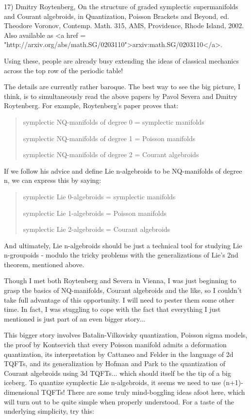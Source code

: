 17) Dmitry Roytenberg, On the structure of graded symplectic 
supermanifolds and Courant algebroids, in Quantization, Poisson 
Brackets and Beyond, ed. Theodore Voronov, Contemp. Math. 315, 
AMS, Providence, Rhode Island, 2002.  Also available as 
<a href = "http://arxiv.org/abs/math.SG/0203110">arxiv:math.SG/0203110</a>.

Using these, people are already busy extending the ideas of
classical mechanics across the top row of the periodic table!

The details are currently rather baroque.  The best way to 
see the big picture, I think, is to simultaneously read the 
above papers by Pavol Severa and Dmitry Roytenberg.  For example,
Roytenberg's paper proves that: 

\begin{quote}
symplectic NQ-manifolds of degree 0 = symplectic manifolds

symplectic NQ-manifolds of degree 1 = Poisson manifolds
 
symplectic NQ-manifolds of degree 2 = Courant algebroids
\end{quote}

If we follow his advice and define Lie n-algebroids to be 
NQ-manifolds of degree n, we can express this by saying:

\begin{quote}
symplectic Lie 0-algebroids = symplectic manifolds

symplectic Lie 1-algebroids = Poisson manifolds
 
symplectic Lie 2-algebroids = Courant algebroids
\end{quote}

And ultimately, Lie n-algebroids should be just a technical
tool for studying Lie n-groupoids - modulo the tricky problems with
the generalizations of Lie's 2nd theorem, mentioned above.

Though I met both Roytenberg and Severa in Vienna, I was 
just beginning to grasp the basics of NQ-manifolds, Courant 
algebroids and the like, so I couldn't take full advantage of this 
opportunity.  I will need to pester them some other time.  In fact, 
I was stuggling to cope with the fact that everything I just mentioned 
is just part of an even bigger story...

This bigger story involves Batalin-Vilkovisky quantization, 
Poisson sigma models, the proof by Kontsevich that every Poisson 
manifold admits a deformation quantization, its interpretation 
by Cattaneo and Felder in the language of 2d TQFTs, and its 
generalization by Hofman and Park to the quantization of Courant 
algebroids using 3d TQFTs... which should itself be the tip of a big
iceberg.  To quantize symplectic Lie n-algebroids, it seems we
need to use (n+1)-dimensional TQFTs! There are some truly 
mind-boggling ideas afoot here, which will turn out to be quite 
simple when properly understood.  For a taste of the underlying 
simplicity, try this:

